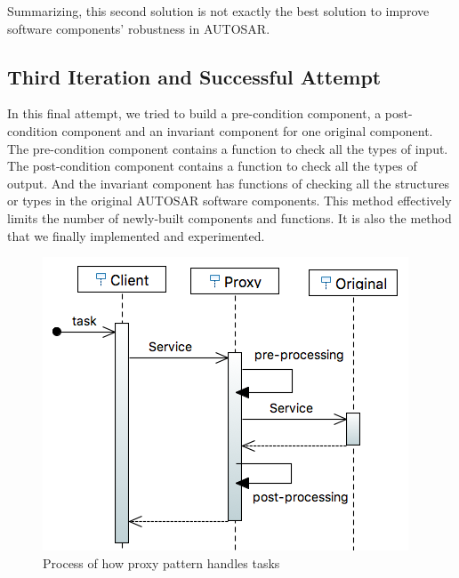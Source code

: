 Summarizing, this second solution is not exactly the best solution to improve software components' robustness in AUTOSAR.



\subsection{Third Iteration and Successful Attempt}
In this final attempt, we tried to build a pre-condition component, a post-condition component and an invariant component for one original component. The pre-condition component contains a function to check all the types of input. The post-condition component contains a function to check all the types of output. And the invariant component has functions of checking all the structures or types in the original AUTOSAR software components. This method effectively limits the number of newly-built components and functions. It is also the method that we finally implemented and experimented. 

\begin{figure}[b]
\centering
\includegraphics[width=.7\columnwidth]{figure/sequence1.png}
\caption{Process of how proxy pattern handles tasks}
\label{fig:proxyPattern}
\end{figure}


